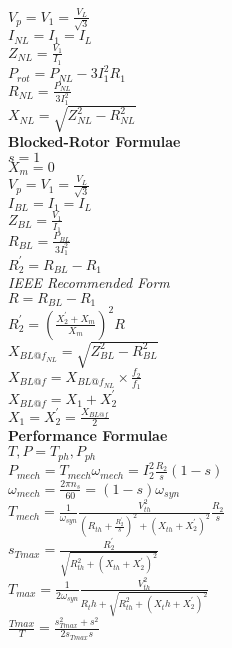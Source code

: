 \documentclass[a4paper, 10pt]{article}
\begin{document}
\begin{paracol}{3}[]
$V_{p}=V_1=\frac{V_L}{\sqrt{3}}$\\
$I_{NL}=I_1=I_L$\\
$Z_{NL}=\frac{V_1}{I_1}$\\

$P_{rot}=P_{NL}-3I_1^2R_1$\\
$R_{NL}=\frac{P_{NL}}{3I_1^2}$\\
$X_{NL}=\sqrt{Z_{NL}^2-R_{NL}^2}$\\

\textbf{Blocked-Rotor Formulae}\\
$s=1$\\
$X_m=0$\\

$V_{p}=V_1=\frac{V_L}{\sqrt{3}}$\\
$I_{BL}=I_1=I_L$\\
$Z_{BL}=\frac{V_1}{I_1}$\\

$R_{BL}=\frac{P_{BL}}{3I_1^2}$\\

$R_{2}^{'}=R_{BL}-R_1$\\
\textit{IEEE Recommended Form}\\
$R=R_{BL}-R_1$\\
$R_{2}^{'}=(\frac{X_{2}^{'}+X_m}{X_m})^2R$\\

\switchcolumn
$X_{BL@f_{NL}}=\sqrt{Z_{BL}^2-R_{BL}^2}$\\
$X_{BL@f}=X_{BL@f_{NL}}\times \frac{f_2}{f_1}$\\
$X_{BL@f}=X_1+X_{2}^{'}$\\
$X_1=X_{2}^{'}=\frac{X_{BL@f}}{2}$\\

\textbf{Performance Formulae}\\
$T,P=T_{ph},P_{ph}$\\

$P_{mech}=T_{mech}\omega_{mech}=I_2^2 \frac{R_2}{s}(1-s)$\\
$\omega_{mech}=\frac{2\pi n_s}{60}=(1-s)\omega_{syn}$\\
$T_{mech}=\frac{1}{\omega_{syn}}\frac{V_{th}^2}{(R_{th}+\frac{R_{2}^{'}}{s})^2 + (X_{th}+X_{2}^{'})^2} \frac{R_2}{s}$\\

$s_{Tmax}=\frac{R_{2}^{'}}{\sqrt{R_{th}^2+(X_{th}+X_{2}^{'})^2}}$\\
$T_{max}=\frac{1}{2\omega_{syn}}\frac{V_{th}^2}{R_th + \sqrt{R_{th}^2 + (X_th + X_{2}^{'})^2}}$\\
$\frac{Tmax}{T}=\frac{s_{Tmax}^2+s^2}{2s_{Tmax}s}$\\


\end{paracol}
\end{document}
